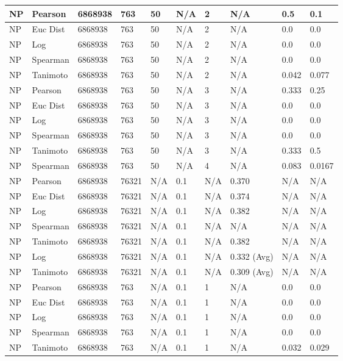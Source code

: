\documentclass{article}
\begin{document}
\begin{longtable}{ |p{1.7cm}|p{1.9cm}|p{1.5cm}|p{1.5cm}|p{0.75cm}|p{0.75cm}|p{0.75cm}|p{0.75cm}|p{1.5cm}|p{1.5cm}|}
    NP & Pearson & 6868938 & 763 & 50 &  N/A & 2 & N/A & 0.5 & 0.1  \\ \hline
    NP & Euc Dist & 6868938 & 763 & 50 & N/A &  2 & N/A &0.0 & 0.0   \\ \hline
    NP & Log & 6868938 & 763 & 50 &  N/A &  2 & N/A & 0.0 & 0.0 \\ \hline
    NP & Spearman & 6868938 & 763 & 50 & N/A &  2 & N/A & 0.0 & 0.0 \\ \hline
    NP & Tanimoto & 6868938 & 763 & 50 & N/A &  2 & N/A & 0.042 & 0.077 \\ \hline
    
    NP & Pearson & 6868938 & 763 & 50&  N/A & 3 & N/A & 0.333 & 0.25  \\ \hline
    NP & Euc Dist & 6868938 & 763 & 50 & N/A & 3  & N/A &0.0 & 0.0   \\ \hline
    NP & Log & 6868938 & 763 & 50 &  N/A & 3  & N/A & 0.0 & 0.0  \\ \hline
    NP & Spearman & 6868938 & 763 & 50 & N/A & 3  & N/A &0.0 & 0.0 \\ \hline
    NP & Tanimoto & 6868938 & 763 & 50 & N/A & 3 & N/A & 0.333 & 0.5 \\ \hline
    NP & Spearman & 6868938 & 763 & 50 & N/A &  4 & N/A & 0.083 & 0.0167 \\ \hline
    
    NP & Pearson & 6868938 & 76321 & N/A &  0.1 & N/A & 0.370 & N/A & N/A  \\ \hline
    NP & Euc Dist & 6868938 & 76321 & N/A &  0.1 & N/A & 0.374 & N/A & N/A   \\ \hline
    NP & Log & 6868938 & 76321 & N/A &  0.1 & N/A & 0.382 & N/A & N/A  \\ \hline
    NP & Spearman & 6868938 & 76321 & N/A &  0.1 & N/A & N/A & N/A & N/A \\ \hline
    NP & Tanimoto & 6868938 & 76321 & N/A &  0.1 & N/A & 0.382 & N/A & N/A \\ \hline
    NP & Log & 6868938 & 76321 & N/A &  0.1 & N/A & 0.332 (Avg) & N/A & N/A \\ \hline
    NP & Tanimoto & 6868938 & 76321 & N/A &  0.1 & N/A & 0.309 (Avg) & N/A & N/A \\ \hline
    
    NP & Pearson & 6868938 & 763 & N/A &  0.1 & 1 & N/A & 0.0 & 0.0  \\ \hline
    NP & Euc Dist & 6868938 & 763 & N/A &  0.1 & 1 & N/A &0.0 & 0.0   \\ \hline
    NP & Log & 6868938 & 763 & N/A &  0.1 & 1 & N/A & 0.0 & 0.0  \\ \hline
    NP & Spearman & 6868938 & 763 & N/A &  0.1 & 1 & N/A &0.0 & 0.0 \\ \hline
    NP & Tanimoto & 6868938 & 763 & N/A &  0.1 & 1 & N/A & 0.032 & 0.029 \\ \hline
    

\end{longtable}
\end{document}

